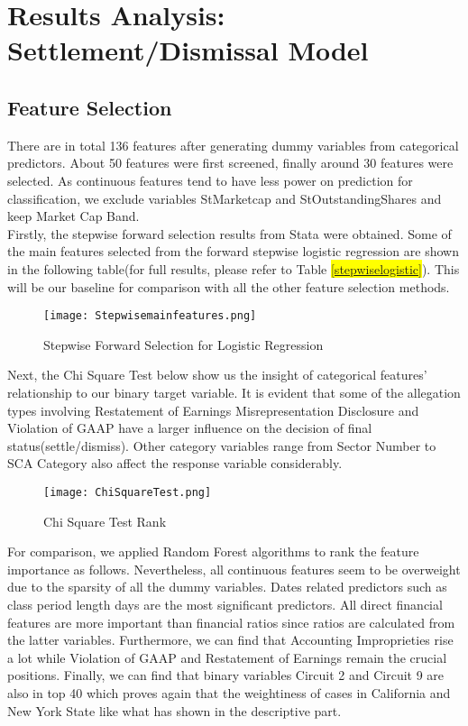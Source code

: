 \section{Results Analysis: Settlement/Dismissal Model}
\subsection{Feature Selection}
There are in total 136 features after generating dummy variables from categorical predictors. About 50 features were first screened, finally around 30 features were selected. As continuous features tend to have less power on prediction for classification, we exclude variables StMarketcap and StOutstandingShares and keep Market Cap Band. \\
\indent Firstly, the stepwise forward selection results from Stata were obtained. Some of the main features selected from the forward stepwise logistic regression are shown in the following table(for full results, please refer to Table \hl{\ref{stepwiselogistic}}). This will be our baseline for comparison with all the other feature selection methods. 
\begin{figure}[H]
  \centering
  \texttt{[image: Stepwisemainfeatures.png]}
  \caption{Stepwise Forward Selection for Logistic Regression}
\end{figure}
Next, the Chi Square Test below show us the insight of categorical features' relationship to our binary target variable. It is evident that some of the allegation types involving Restatement of Earnings Misrepresentation Disclosure and Violation of GAAP have a larger influence on the decision of final status(settle/dismiss). Other category variables range from Sector Number to SCA Category also affect the response variable considerably. 
\begin{figure}[H]
  \centering
  \texttt{[image: ChiSquareTest.png]}
  \caption{Chi Square Test Rank}
\end{figure}
For comparison, we applied Random Forest algorithms to rank the feature importance as follows. Nevertheless, all continuous features seem to be overweight due to the sparsity of all the dummy variables. Dates related predictors such as class period length days are the most significant predictors. All direct financial features are more important than financial ratios since ratios are calculated from the latter variables. Furthermore, we can find that Accounting Improprieties rise a lot while Violation of GAAP and Restatement of Earnings remain the crucial positions. Finally, we can find that binary variables Circuit 2 and Circuit 9 are also in top 40 which proves again that the weightiness of cases in California and New York State like what has shown in the descriptive part. 
